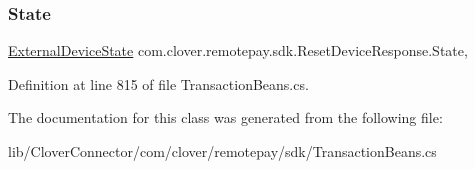 \subsubsection{\texorpdfstring{State}{State}}
{\footnotesize\ttfamily \hyperlink{namespacecom_1_1clover_1_1remotepay_1_1sdk_a9d5838a91e2711306ad561d104fed034}{External\+Device\+State} com.\+clover.\+remotepay.\+sdk.\+Reset\+Device\+Response.\+State\hspace{0.3cm}{\ttfamily [get]}, {\ttfamily [set]}}



Definition at line 815 of file Transaction\+Beans.\+cs.



The documentation for this class was generated from the following file\+:\begin{DoxyCompactItemize}
\item 
lib/\+Clover\+Connector/com/clover/remotepay/sdk/Transaction\+Beans.\+cs\end{DoxyCompactItemize}
